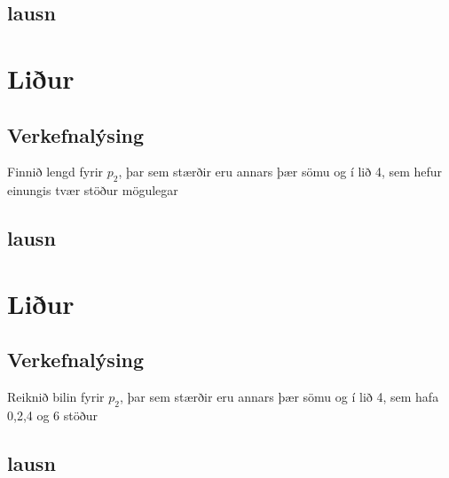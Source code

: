 \documentclass[11pt]{article}   %
\numberwithin{equation}{section} %
\begin{document}
\subsection{lausn}


\section{Liður}%
\subsection{Verkefnalýsing}%
Finnið lengd fyrir $p_2$, þar sem stærðir eru annars þær sömu og í lið 4, sem hefur einungis tvær stöður mögulegar
\subsection{lausn}


\section{Liður}%
\subsection{Verkefnalýsing}
Reiknið bilin fyrir $p_2$, þar sem stærðir eru annars þær sömu og í lið 4, sem hafa 0,2,4 og 6 stöður
\subsection{lausn}
\end{document}
